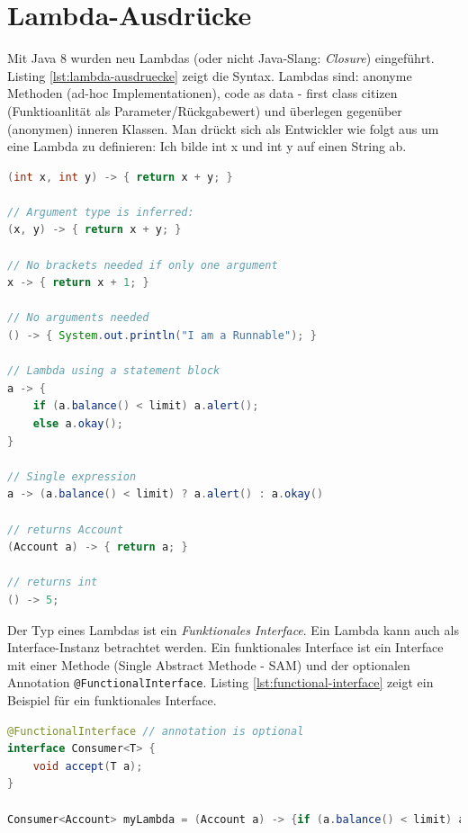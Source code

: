 \section{Lambda-Ausdrücke}

Mit Java 8 wurden neu Lambdas (oder nicht Java-Slang: \textit{Closure}) eingeführt. Listing \ref{lst:lambda-ausdruecke} zeigt die Syntax. Lambdas sind: anonyme Methoden (ad-hoc Implementationen), code as data - first class citizen (Funktioanlität als Parameter/Rückgabewert) und überlegen gegenüber (anonymen) inneren Klassen. Man drückt sich als Entwickler wie folgt aus um eine Lambda zu definieren: Ich bilde int x und int y auf einen String ab.

\begin{lstlisting}[language=Java, caption=Lambda-Ausdrücke, label=lst:lambda-ausdruecke]
(int x, int y) -> { return x + y; }

// Argument type is inferred:
(x, y) -> { return x + y; }

// No brackets needed if only one argument
x -> { return x + 1; }

// No arguments needed
() -> { System.out.println("I am a Runnable"); }

// Lambda using a statement block
a -> {
	if (a.balance() < limit) a.alert();
	else a.okay();
}

// Single expression
a -> (a.balance() < limit) ? a.alert() : a.okay()

// returns Account
(Account a) -> { return a; }

// returns int
() -> 5;
\end{lstlisting}

Der Typ eines Lambdas ist ein \textit{Funktionales Interface}. Ein Lambda kann auch als Interface-Instanz betrachtet werden. Ein funktionales Interface ist ein Interface mit einer Methode (Single Abstract Methode - SAM) und der optionalen Annotation \verb|@FunctionalInterface|. Listing \ref{lst:functional-interface} zeigt ein Beispiel für ein funktionales Interface.

\begin{lstlisting}[language=Java, caption=functional interface (SAM), label=lst:functional-interface]
@FunctionalInterface // annotation is optional
interface Consumer<T> {
	void accept(T a);
}

Consumer<Account> myLambda = (Account a) -> {if (a.balance() < limit) a.alert(); };
\end{lstlisting}


